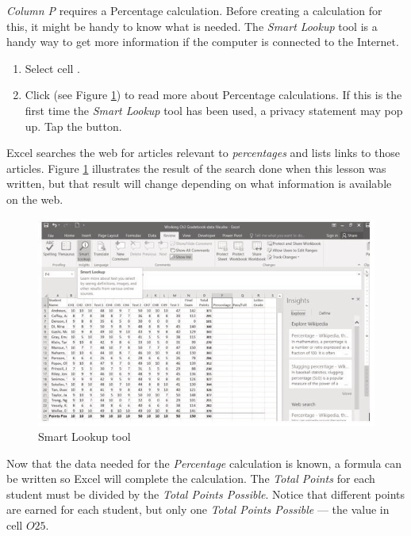 \textit{Column P} requires a Percentage calculation. Before creating a calculation for this, it might be handy to know what is needed. The \textit{Smart Lookup} tool is a handy way to get more information if the computer is connected to the Internet.

\begin{enumbox}
	\begin{enumerate}
		\item Select cell .
		\item Click  (see Figure \ref{03:fig06}) to read more about Percentage calculations. If this is the first time the \textit{Smart Lookup} tool has been used, a privacy statement may pop up. Tap the  button.
	\end{enumerate}
\end{enumbox}
	
Excel searches the web for articles relevant to \textit{percentages} and lists links to those articles. Figure \ref{03:fig06} illustrates the result of the search done when this lesson was written, but that result will change depending on what information is available on the web.

\begin{figure}[H]
	\centering
	\includegraphics[width=\maxwidth{.95\linewidth}]{gfx/ch03_fig06}
	\caption{Smart Lookup tool}
	\label{03:fig06}
\end{figure}

Now that the data needed for the \textit{Percentage} calculation is known, a formula can be written so Excel will complete the calculation. The \textit{Total Points} for each student must be divided by the \textit{Total Points Possible}. Notice that different points are earned for each student, but only one \textit{Total Points Possible} --- the value in cell $ O25 $.

